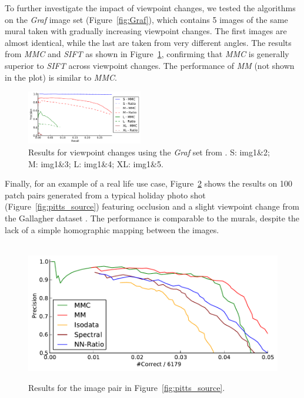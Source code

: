\documentclass{article}
\begin{document}
To further investigate the impact of viewpoint changes, we tested the 
algorithms on the \emph{Graf} image set (Figure~\ref{fig:Graf}), which 
contains 5 images of the same mural taken with gradually increasing 
viewpoint changes.  The first images are almost identical, while the 
last are taken from very different angles. The results from   \emph{MMC} 
and \emph{SIFT} as shown in Figure~\ref{fig:result_viewpoint}, 
confirming that \emph{MMC} is generally superior to \emph{SIFT} across 
viewpoint changes.
The performance of \emph{MM} (not shown in the plot) is similar to 
\emph{MMC}.

\begin{figure}[htb]
	\centering
	\includegraphics[width=0.45\textwidth]{images/result_viewpoint}
	\caption{Results for viewpoint changes using the \emph{Graf} set from 
		\cite{mikolajczyk2005performance}.  S: img1\&2; M: img1\&3; L: img1\&4; XL: img1\&5.}
	\label{fig:result_viewpoint}
\end{figure}


Finally, for an example of a real life use case, Figure~\ref{fig:result_pitts} 
shows the results on 100 patch pairs generated 
from a typical holiday photo shot (Figure~\ref{fig:pitts_source}) featuring occlusion and a slight viewpoint 
change from the Gallagher dataset \cite{gallagher2008}.  The performance is comparable to the murals, despite the lack of a simple homographic mapping between the images.


\begin{figure}[htb]
		~%
			\centering
			\includegraphics[width=0.6\columnwidth]{images/result_pitts}
	\caption{Results for the image pair in Figure~\ref{fig:pitts_source}.}
	\label{fig:result_pitts}
\end{figure}
\end{document}
